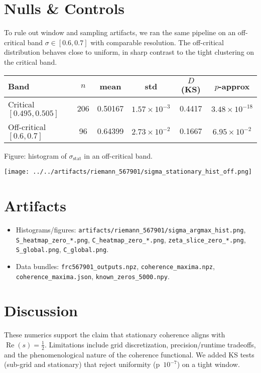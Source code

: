 \documentclass[10pt]{article}
\begin{document}
\section*{Nulls \& Controls}
To rule out window and sampling artifacts, we ran the same pipeline on an off-critical band $\sigma\in[0.6,0.7]$ with comparable resolution. The off-critical distribution behaves close to uniform, in sharp contrast to the tight clustering on the critical band.

\begin{center}
\begin{tabular}{@{}lccccc@{}}
\textbf{Band} & $n$ & mean & std & $D$ (KS) & $p$-approx \\
\hline
Critical $[0.495,0.505]$ & 206 & 0.50167 & $1.57\times10^{-3}$ & 0.4417 & $3.48\times10^{-18}$ \\
Off-critical $[0.6,0.7]$ & 96 & 0.64399 & $2.73\times10^{-2}$ & 0.1667 & $6.95\times10^{-2}$ \\
\end{tabular}
\end{center}

\noindent Figure: histogram of $\sigma_{\mathrm{stat}}$ in an off-critical band.
\begin{center}
\texttt{[image: ../../artifacts/riemann\_567901/sigma\_stationary\_hist\_off.png]}
\end{center}

\section*{Artifacts}
\begin{itemize}
  \item Histograms/figures: \texttt{artifacts/riemann\_567901/sigma\_argmax\_hist.png}, \texttt{S\_heatmap\_zero\_*.png}, \texttt{C\_heatmap\_zero\_*.png}, \texttt{zeta\_slice\_zero\_*.png}, \texttt{S\_global.png}, \texttt{C\_global.png}.
  \item Data bundles: \texttt{frc567901\_outputs.npz}, \texttt{coherence\_maxima.npz}, \texttt{coherence\_maxima.json}, \texttt{known\_zeros\_5000.npy}.
\end{itemize}

\section*{Discussion}
These numerics support the claim that stationary coherence aligns with $\operatorname{Re}(s)=\tfrac12$. Limitations include grid discretization, precision/runtime tradeoffs, and the phenomenological nature of the coherence functional. We added KS tests (sub-grid and stationary) that reject uniformity (p~$10^{-7}$) on a tight window.
\end{document}
